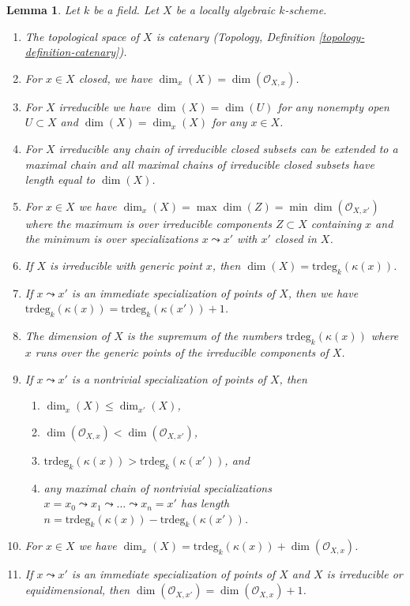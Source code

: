 \documentclass[10pt,a4paper]{amsart}
\theoremstyle{plain}
\newtheorem{lemma}[subsection]{Lemma}
\theoremstyle{definition}
\theoremstyle{remark}
\numberwithin{equation}{subsection}
\begin{document}
\begin{lemma}
\label{lemma-dimension-locally-algebraic}
Let $k$ be a field. Let $X$ be a locally algebraic $k$-scheme.
\begin{enumerate}
\item
\label{item-catenary}
The topological space of $X$ is catenary
(Topology, Definition \ref{topology-definition-catenary}).
\item
\label{item-dimension-at-closed-point}
For $x \in X$ closed, we have $\dim_x(X) = \dim(\mathcal{O}_{X, x})$.
\item
\label{item-dimension-irreducible}
For $X$ irreducible we have $\dim(X) = \dim(U)$ for any
nonempty open $U \subset X$ and $\dim(X) = \dim_x(X)$
for any $x \in X$.
\item
\label{item-irreducible-maximal-chains}
For $X$ irreducible any chain of irreducible closed subsets can be
extended to a maximal chain and all maximal chains of irreducible
closed subsets have length equal to $\dim(X)$.
\item
\label{item-dimension-irreducibles-passing-through}
For $x \in X$ we have
$\dim_x(X) = \max \dim(Z) = \min \dim(\mathcal{O}_{X, x'})$
where the maximum is over irreducible components
$Z \subset X$ containing $x$ and the minimum is over
specializations $x \leadsto x'$ with $x'$ closed in $X$.
\item
\label{item-dimension-irreducible-trdeg}
If $X$ is irreducible with generic point $x$, then
$\dim(X) = \text{trdeg}_k(\kappa(x))$.
\item
\label{item-immediate-specialization}
If $x \leadsto x'$ is an immediate specialization
of points of $X$, then we have
$\text{trdeg}_k(\kappa(x)) = \text{trdeg}_k(\kappa(x')) + 1$.
\item
\label{item-dimension-sup-trdeg}
The dimension of $X$ is the supremum of the numbers
$\text{trdeg}_k(\kappa(x))$ where $x$ runs over the
generic points of the irreducible components of $X$.
\item
\label{item-specialization}
If $x \leadsto x'$ is a nontrivial specialization of points of $X$, then
\begin{enumerate}
\item $\dim_x(X) \leq \dim_{x'}(X)$,
\item $\dim(\mathcal{O}_{X, x}) < \dim(\mathcal{O}_{X, x'})$,
\item $\text{trdeg}_k(\kappa(x)) > \text{trdeg}_k(\kappa(x'))$, and
\item any maximal chain of nontrivial specializations
$x = x_0 \leadsto x_1 \leadsto \ldots \leadsto x_n = x'$ has
length $n = \text{trdeg}_k(\kappa(x)) - \text{trdeg}_k(\kappa(x'))$.
\end{enumerate}
\item
\label{item-dimension-formula}
For $x \in X$ we have
$\dim_x(X) = \text{trdeg}_k(\kappa(x)) + \dim(\mathcal{O}_{X, x})$.
\item
\label{item-immediate-specialization-local-ring}
If $x \leadsto x'$ is an immediate specialization
of points of $X$ and $X$ is irreducible or equidimensional, then
$\dim(\mathcal{O}_{X, x'}) = \dim(\mathcal{O}_{X, x}) + 1$.
\end{enumerate}
\end{lemma}
\end{document}
